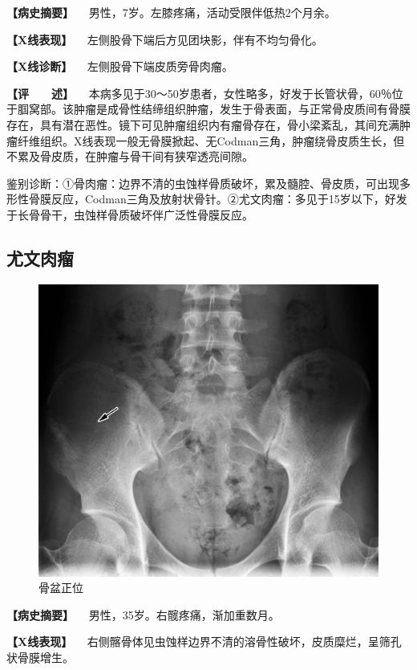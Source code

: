 \textbf{【病史摘要】} 　男性，7岁。左膝疼痛，活动受限伴低热2个月余。

\textbf{【X线表现】} 　左侧股骨下端后方见团块影，伴有不均匀骨化。

\textbf{【X线诊断】} 　左侧股骨下端皮质旁骨肉瘤。

\textbf{【评　　述】}
　本病多见于30～50岁患者，女性略多，好发于长管状骨，60％位于腘窝部。该肿瘤是成骨性结缔组织肿瘤，发生于骨表面，与正常骨皮质间有骨膜存在，具有潜在恶性。镜下可见肿瘤组织内有瘤骨存在，骨小梁紊乱，其间充满肿瘤纤维组织。X线表现一般无骨膜掀起、无Codman三角，肿瘤绕骨皮质生长，但不累及骨皮质，在肿瘤与骨干间有狭窄透亮间隙。

鉴别诊断：①骨肉瘤：边界不清的虫蚀样骨质破坏，累及髓腔、骨皮质，可出现多形性骨膜反应，Codman三角及放射状骨针。②尤文肉瘤：多见于15岁以下，好发于长骨骨干，虫蚀样骨质破坏伴广泛性骨膜反应。

\subsection{尤文肉瘤}

\begin{figure}[!htbp]
 \centering
 \includegraphics{./images/Image00100.jpg}
 \captionsetup{justification=centering}
 \caption{骨盆正位}
 \label{fig2-7-15}
  \end{figure} 

\textbf{【病史摘要】} 　男性，35岁。右髋疼痛，渐加重数月。

\textbf{【X线表现】}
　右侧髂骨体见虫蚀样边界不清的溶骨性破坏，皮质糜烂，呈筛孔状骨膜增生。

